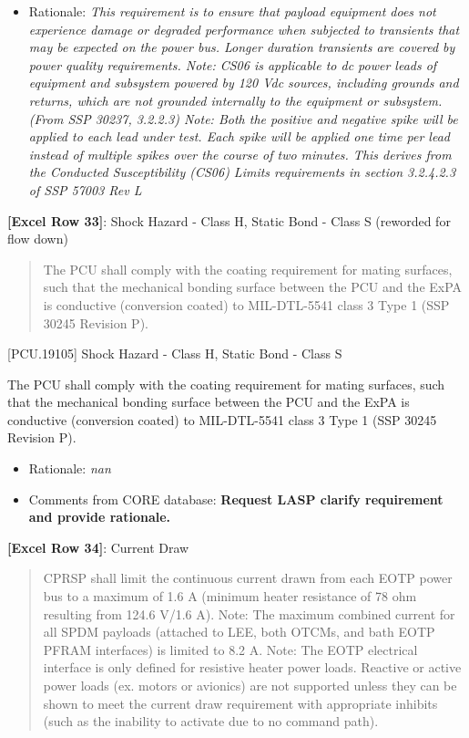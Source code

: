 \begin{itemize}
\item{} Rationale: \emph{This requirement is to ensure that payload equipment does not experience damage or degraded performance when subjected to transients that may be expected on the power bus. Longer duration transients are covered by power quality requirements. Note: CS06 is applicable to dc power leads of equipment and subsystem powered by 120 Vdc sources, including grounds and returns, which are not grounded internally to the equipment or subsystem. (From SSP 30237, 3.2.2.3) Note: Both the positive and negative spike will be applied to each lead under test. Each spike will be applied one time per lead instead of multiple spikes over the course of two minutes. This derives from the Conducted Susceptibility (CS06) Limits requirements in section 3.2.4.2.3 of SSP 57003 Rev L}

\end{itemize}

\textbf{[Excel Row 33]}: Shock Hazard - Class H, Static Bond - Class S (reworded for flow down)

\begin{quote}
The PCU shall comply with the coating requirement for mating surfaces, such that the mechanical bonding surface between the PCU and the ExPA is conductive (conversion coated) to MIL-DTL-5541 class 3 Type 1 (SSP 30245 Revision P).
\end{quote}

[PCU.19105] Shock Hazard - Class H, Static Bond - Class S

The PCU shall comply with the coating requirement for mating surfaces, such that the mechanical bonding surface between the PCU and the ExPA is conductive (conversion coated) to MIL-DTL-5541 class 3 Type 1 (SSP 30245 Revision P).

\begin{itemize}
\item{} Rationale: \emph{nan}

\item{} Comments from CORE database: \textbf{Request LASP clarify requirement and provide rationale.}

\end{itemize}

\textbf{[Excel Row 34]}: Current Draw

\begin{quote}
CPRSP shall limit the continuous current drawn from each EOTP power bus to a maximum of 1.6 A (minimum heater resistance of 78 ohm resulting from 124.6 V\slash 1.6 A).
Note: The maximum combined current for all SPDM payloads (attached to LEE, both OTCMs, and bath EOTP PFRAM interfaces) is limited to 8.2 A.
Note: The EOTP electrical interface is only defined for resistive heater power loads. Reactive or active power loads (ex. motors or avionics) are not supported unless they can be shown to meet the current draw requirement with appropriate inhibits (such as the inability to activate due to no command path).
\end{quote}

